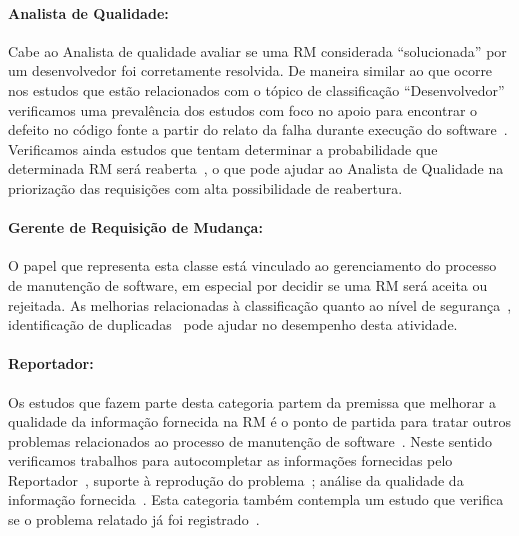 \paragraph{Analista de Qualidade:}

Cabe ao Analista de qualidade avaliar se uma RM considerada ``solucionada'' por
um desenvolvedor foi corretamente resolvida. De maneira similar ao que ocorre
nos estudos que estão relacionados com o tópico de classificação
``Desenvolvedor'' verificamos uma prevalência dos estudos com foco no apoio para
encontrar o defeito no código fonte a partir do relato da falha durante execução
do software~\cite{corley2011recovering,Wong:2014:BBF:2705615.2706096,
    Thung:2014:BIT:2635868.2661678,Nguyen:2012:MAR:2393596.2393671,thung2013automatic,
    Romo:2015:TAT:2745802.2745833}. Verificamos ainda estudos que tentam
determinar a probabilidade que determinada RM será
reaberta~\cite{xia2015automatic}, o que pode ajudar ao Analista de Qualidade na
priorização das requisições com alta possibilidade de reabertura.

\paragraph{Gerente de Requisição de	Mudança:}

O papel que representa esta classe está vinculado ao gerenciamento do processo
de manutenção de software, em especial por decidir se uma RM será aceita ou
rejeitada. As melhorias relacionadas à classificação quanto ao
nível de segurança~\cite{gegick2010identifying, zhang2011bug,
    ValdiviaGarcia:2014:CPB:2597073.2597099}, identificação de
duplicadas~\cite{hindle2016contextual, sun2010discriminative,
    alipour2013contextual, banerjee2012automated} pode ajudar no desempenho
desta atividade.

\paragraph{Reportador:}

Os estudos que fazem parte desta categoria  partem da premissa que melhorar a
qualidade da informação fornecida na RM é o ponto de partida para tratar outros
problemas relacionados ao processo de manutenção de
software~\cite{moran2015auto, Moran:2015:EAA:2786805.2807557,
    zimmermann2010makes}. Neste sentido verificamos trabalhos para
autocompletar as informações fornecidas pelo Reportador~\cite{moran2015auto},
suporte à reprodução do problema~\cite{Moran:2015:EAA:2786805.2807557}; análise
da qualidade da informação fornecida~\cite{zimmermann2010makes,
    Tu:2014:MQI:2677832.2677844}.  Esta categoria também contempla um estudo
que verifica se o problema relatado já foi registrado~\cite{Thung2014}.

